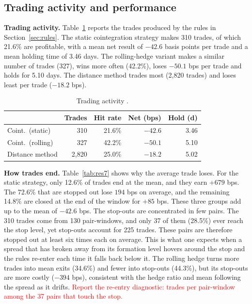 \documentclass[10pt,a4paper,twocolumn]{article}
\newcommand{\TBD}[1]{\textcolor{red}{#1}}
\begin{document}
\subsection{Trading activity and performance}
\textbf{Trading activity.} Table~\ref{tab:res4} reports the trades produced by the rules in Section~\ref{sec:rules}. The static cointegration strategy makes 310 trades, of which 21.6\% are profitable, with a mean net result of $-42.6$ basis points per trade and a mean holding time of 3.46 days. The rolling-hedge variant makes a similar number of trades (327), wins more often (42.2\%), loses $-50.1$ bps per trade and holds for 5.10 days. The distance method trades most (2{,}820 trades) and loses least per trade ($-18.2$ bps).

\begin{table}[htbp]
	\centering
	\small
	\caption{Trading activity .}
	\label{tab:res4}
	\begin{tabularx}{\columnwidth}{@{}Xrrrr@{}}
		\toprule
		& Trades & Hit rate & Net (bps) & Hold (d) \\
		\midrule
		Coint.\ (static) & 310 & 21.6\% & $-42.6$ & 3.46 \\
		Coint.\ (rolling) & 327 & 42.2\% & $-50.1$ & 5.10 \\
		Distance method & 2{,}820 & 25.0\% & $-18.2$ & 5.02 \\
		\bottomrule
	\end{tabularx}
\end{table}

\textbf{How trades end.} Table~\ref{tab:res7} shows why the average trade loses. For the static strategy, only 12.6\% of trades end at the mean, and they earn $+679$ bps. The 72.6\% that are stopped out lose $194$ bps on average, and the remaining 14.8\% are closed at the end of the window for $+85$ bps. These three groups add up to the mean of $-42.6$ bps. The stop-outs are concentrated in few pairs. The 310 trades come from 130 pair-windows, and only 37 of them (28.5\%) ever reach the stop level, yet stop-outs account for 225 trades. These pairs are therefore stopped out at least six times each on average. This is what one expects when a spread that has broken away from its formation level hovers around the stop and the rules re-enter each time it falls back below it. The rolling hedge turns more trades into mean exits (34.6\%) and fewer into stop-outs (44.3\%), but its stop-outs are more costly ($-394$ bps), consistent with the hedge ratio and mean following the spread as it drifts. \TBD{Report the re-entry diagnostic: trades per pair-window among the 37 pairs that touch the stop.}
\end{document}
